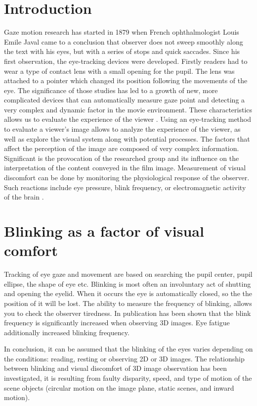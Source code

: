 \documentclass[runningheads,a4paper]{llncs}
\begin{document}
\section{Introduction}\label{sec:intro}
Gaze motion research has started in 1879 when French ophthalmologist Louis Emile Javal came to a conclusion that observer does not sweep smoothly along the text with his eyes, but with a series of stops and quick saccades\cite{Winery}.  Since his first observation, the eye-tracking devices were developed. Firstly readers had to wear a type of contact lens with a small opening for the pupil. The lens was attached to a pointer which changed its position following the movements of the eye. The significance of those studies has led to a growth of new, more complicated devices that can automatically measure gaze point and detecting a very complex and dynamic factor in the movie environment. These characteristics allows us to evaluate the experience of the viewer \cite{mital2011clustering}.
Using an eye-tracking method to evaluate a viewer's image allows to analyze the experience of the viewer, as well as explore the visual system along with potential processes.
The factors that affect the perception of the image are composed of very complex information. Significant is the provocation of the researched group and its influence on the interpretation of the content conveyed in the film image. Measurement of visual discomfort can be done by monitoring the physiological response of the observer. Such reactions include eye pressure, blink frequency, or electromagnetic activity of the brain \cite{Fornalczyk_Napieralski_Szajerman_Wojciechowski_2015, Fornalczyk_Napieralski_Szajerman_Wojciechowski_20152}.



\section{Blinking as a factor of visual comfort}
Tracking of eye gaze and movement are based on searching the pupil center, pupil ellipse, the shape of eye etc. Blinking is most often an involuntary act of shutting and opening the eyelid. When it occurs the eye is automatically closed, so the the position of it will be lost. The ability to measure the frequency of blinking, allows you to check the observer tiredness. In publication \cite{5606312} has been shown that the blink frequency is significantly increased when observing 3D images. Eye fatigue additionally increased blinking frequency. 
\par In conclusion, it can be assumed that the blinking of the eyes varies depending on the conditions: reading, resting or observing 2D or 3D images. The relationship between blinking and visual discomfort of 3D image observation has been investigated, it is resulting from faulty disparity, speed, and type of motion of the scene objects (circular motion on the image plane, static scenes, and inward motion). 
\end{document}
